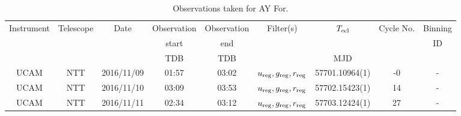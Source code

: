 \begin{table}
	\begin{center}
		\caption{Observations taken for AY For.}
		\label{table:observing:observation logs AYFor}
		\begin{tabular}{ccccccccc}
			\hline
			Instrument & Telescope & Date & Observation  & Observation  & Filter(s) & $T_{\rm ecl}$ & Cycle No. & Binning \\
			 &  &  &  start &  end &  &  &  & ID \\
			 &  &  & TDB & TDB &  & MJD &  &  \\
			\hline
			\hline
			UCAM & NTT & 2016/11/09 & 01:57 & 03:02 & $u_{\rm reg},g_{\rm reg},r_{\rm reg}$ & 57701.10964(1) & -0 & - \\
			UCAM & NTT & 2016/11/10 & 03:09 & 03:53 & $u_{\rm reg},g_{\rm reg},r_{\rm reg}$ & 57702.15423(1) & 14 & - \\
			UCAM & NTT & 2016/11/11 & 02:34 & 03:12 & $u_{\rm reg},g_{\rm reg},r_{\rm reg}$ & 57703.12424(1) & 27 & - \\
		   \hline
		\end{tabular}
	\end{center}
\end{table}